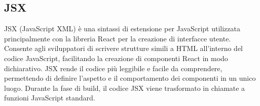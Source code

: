 \vspace{2em}
\subsection*{JSX}
\par JSX (JavaScript XML) è una sintassi di estensione per JavaScript utilizzata principalmente con la libreria React per la creazione di interfacce utente. Consente agli sviluppatori di scrivere strutture simili a HTML all'interno del codice JavaScript, facilitando la creazione di componenti React in modo dichiarativo. JSX rende il codice più leggibile e facile da comprendere, permettendo di definire l'aspetto e il comportamento dei componenti in un unico luogo. Durante la fase di build, il codice JSX viene trasformato in chiamate a funzioni JavaScript standard.

